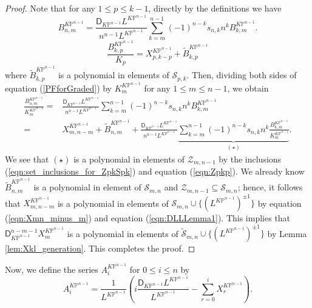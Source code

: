 \documentclass[12pt]{amsart}
\numberwithin{equation}{section}
\newcommand{\KP}{K\mathbb{P}}
\begin{document}
\begin{proof}
Note that for any $1\leq{p}\leq{k-1}$, directly by the definitions we have
\begin{equation}
B^{\KP^{n-1}}_{n,m}
=\frac{\mathsf{D}_{\KP^{n-1}}L^{\KP^{n-1}}}{n^{n-1}L^{\KP^{n-1}}}\sum\limits_{k=m }^{n-1}(-1)^{n-k}{s}_{n,k}n^kB^{\KP^{n-1}}_{k,m}.
\end{equation}
\begin{equation}\label{eqn:Zpkp}
\frac{B^{\KP^{n-1}}_{k,p}}{K_p}=X^{\KP^{n-1}}_{p,k-p}+\widetilde{B}^{\KP^{n-1}}_{k,p}
\end{equation}
where $\widetilde{B}^{\KP^{n-1}}_{k,p}$ is a polynomial in elements of $\mathcal{S}_{p,k}$. Then, dividing both sides of equation (\ref{PFforGraded}) by $K^{\KP^{n-1}}_m$ for any $1\leq{m}\leq{n-1}$, we obtain
\begin{equation}\label{eqn:Xmn_minus_m}
\begin{split}
\frac{B^{\KP^{n-1}}_{n,m}}{K^{\KP^{n-1}}_m}
=&\frac{\mathsf{D}_{\KP^{n-1}}L^{\KP^{n-1}}}{n^{n-1}L^{\KP^{n-1}}}\sum\limits_{k=m }^{n-1}(-1)^{n-k}{s}_{n,k}n^kB^{\KP^{n-1}}_{k,m}\\
=&X^{\KP^{n-1}}_{m,n-m}+\widetilde{B}^{\KP^{n-1}}_{n,m}+\frac{\mathsf{D}_{\KP^{n-1}}L^{\KP^{n-1}}}{n^{n-1}L^{\KP^{n-1}}}\underbrace{\sum\limits_{k=m }^{n-1}(-1)^{n-k}{s}_{n,k}n^k\frac{B^{\KP^{n-1}}_{k,m}}{K^{\KP^{n-1}}_m}}_{(\star)}.
\end{split}
\end{equation}
We see that $(\star)$ is a polynomial in elements of $\mathcal{Z}_{m,n-1}$ by the inclusions (\ref{eqn:set_inclusions_for_ZpkSpk}) and equation (\ref{eqn:Zpkp}). We already know $\widetilde{B}^{\KP^{n-1}}_{n,m}$ is a polynomial in element of $\mathcal{S}_{m,n}$ and $\mathcal{Z}_{m,n-1}\subseteq\mathcal{S}_{m,n}$; hence, it follows that $X^{\KP^{n-1}}_{m,n-m}$ is a polynomial in elements of $\mathcal{S}_{m,n}\cup\{{(L^{\KP^{n-1}})^{\pm1}}\}$ by equation (\ref{eqn:Xmn_minus_m}) and equation (\ref{eqn:DLLLemma1}). This implies that $\mathsf{D}_{\KP^{n-1}}^{n-m-1}X^{\KP^{n-1}}_m$ is a polynomial in elements of $\widetilde{\mathcal{S}}_{m,n}\cup\{(L^{\KP^{n-1}})^{\pm1}\}$ by Lemma \ref{lem:Xkl_generation}. This completes the proof.
\end{proof}

Now, we define the series $A^{\KP^{n-1}}_i$ for $0\leq i\leq n$ by
\begin{equation*}
A^{\KP^{n-1}}_i=\frac{1}{L^{\KP^{n-1}}}\left(i\frac{\mathsf{D}_{\KP^{n-1}}L^{\KP^{n-1}}}{L^{\KP^{n-1}}}-\sum_{r=0}^{i} X^{\KP^{n-1}}_{r}\right).
\end{equation*}
\end{document}
